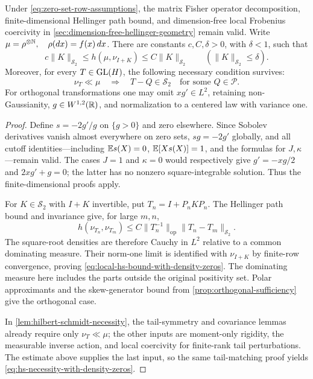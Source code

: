 \begin{proposition}
\label{prop:local-coercivity-with-density-zeros}
Under \eqref{eq:zero-set-row-assumptions}, the matrix Fisher operator decomposition,
finite-dimensional Hellinger path bound, and dimension-free local
Frobenius coercivity in
\cref{sec:dimension-free-hellinger-geometry} remain valid.
Write \(\mu=\rho^{\otimes\mathbb N},\quad\rho(dx)=f(x)\,dx\).
There are constants \(c,C,\delta>0\), with \(\delta<1\), such that
\begin{equation}
 c\|K\|_{\mathcal S_2}\leq h(\mu,\nu_{I+K})
       \leq C\|K\|_{\mathcal S_2}
 \qquad(\|K\|_{\mathcal S_2}\leq\delta).
 \label{eq:local-hs-bound-with-density-zeros}
\end{equation}
Moreover, for every \(T\in\operatorname{GL}(H)\), the following necessary
condition survives:
\begin{equation}
 \nu_T\ll\mu
 \quad\Longrightarrow\quad
 T-Q\in\mathcal S_2
 \quad\text{for some }Q\in\mathcal P.
 \label{eq:hs-necessity-with-density-zeros}
\end{equation}
For orthogonal transformations one may omit \(xg'\in L^2\),
retaining non-Gaussianity, \(g\in W^{1,2}(\mathbb R)\), and normalization to a
centered law with variance one.
\end{proposition}
\begin{proof}
Define \(s=-2g'/g\) on \(\{g>0\}\) and zero elsewhere.  Since Sobolev
derivatives vanish almost everywhere on zero sets, \(sg=-2g'\) globally, and
all cutoff identities---including \(\mathbb E s(X)=0\), \(\mathbb E[Xs(X)]=1\), and the
formulas for \(J,\kappa\)---remain valid.  The cases \(J=1\) and \(\kappa=0\)
would respectively give \(g'=-xg/2\) and \(2xg'+g=0\); the latter has no
nonzero square-integrable solution.  Thus the finite-dimensional proofs apply.

For \(K\in\mathcal S_2\) with \(I+K\) invertible, put
\(T_n=I+P_nKP_n\).
The Hellinger path bound and invariance give, for large \(m,n\),
\[
 h(\nu_{T_n},\nu_{T_m})
 \leq C\|T_n^{-1}\|_{\mathrm{op}}
                 \|T_n-T_m\|_{\mathcal S_2}.
\]
The square-root densities are therefore Cauchy in \(L^2\) relative to a common
dominating measure.  Their norm-one limit is identified with \(\nu_{I+K}\) by
finite-row convergence, proving \eqref{eq:local-hs-bound-with-density-zeros}.
The dominating measure here includes the parts outside the original
positivity set. Polar approximants and the skew-generator bound
from \cref{prop:orthogonal-sufficiency} give the orthogonal case.

In \cref{lem:hilbert-schmidt-necessity}, the tail-symmetry and covariance
lemmas already require only \(\nu_T\ll\mu\); the other inputs are moment-only
rigidity, the measurable inverse action, and local coercivity for finite-rank
tail perturbations.  The estimate above supplies the last input, so the same
tail-matching proof yields \eqref{eq:hs-necessity-with-density-zeros}.
\end{proof}


